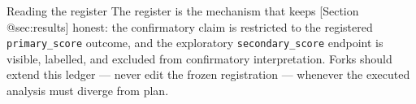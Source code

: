 \documentclass[
  ignorenonframetext,
]{beamer}
\begin{document}
\begin{frame}{Reading the register}
\protect{}\label{reading-the-register}
The register is the mechanism that keeps {[}Section @sec:results{]}
honest: the confirmatory claim is restricted to the registered
\texttt{primary\_score} outcome, and the exploratory
\texttt{secondary\_score} endpoint is visible, labelled, and excluded
from confirmatory interpretation. Forks should extend this ledger ---
never edit the frozen registration --- whenever the executed analysis
must diverge from plan.
\end{frame}
\end{document}
